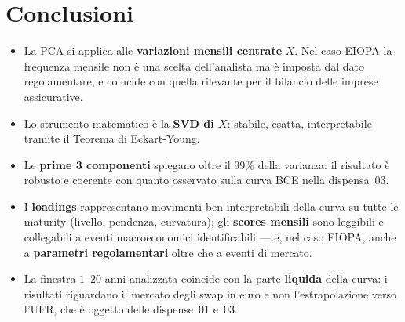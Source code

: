\documentclass[11pt,a4paper]{article}
\newcommand{\UFR}{\ensuremath{\mathrm{UFR}}}
\theoremstyle{plain}
\theoremstyle{definition}
\theoremstyle{remark}
\begin{document}
\section{Conclusioni}

\begin{itemize}
  \item La PCA si applica alle \textbf{variazioni mensili centrate} $X$. Nel
        caso EIOPA la frequenza mensile non \`e una scelta dell'analista ma
        \`e imposta dal dato regolamentare, e coincide con quella rilevante
        per il bilancio delle imprese assicurative.
  \item Lo strumento matematico \`e la \textbf{SVD di $X$}: stabile, esatta,
        interpretabile tramite il Teorema di Eckart-Young.
  \item Le \textbf{prime 3 componenti} spiegano oltre il 99\% della varianza:
        il risultato \`e robusto e coerente con quanto osservato sulla curva
        BCE nella dispensa~03.
  \item I \textbf{loadings} rappresentano movimenti ben interpretabili della
        curva su tutte le maturity (livello, pendenza, curvatura); gli
        \textbf{scores mensili} sono leggibili e collegabili a eventi
        macroeconomici identificabili --- e, nel caso EIOPA, anche a
        \textbf{parametri regolamentari} oltre che a eventi di mercato.
  \item La finestra $1$--$20$ anni analizzata coincide con la parte
        \textbf{liquida} della curva: i risultati riguardano il mercato degli
        swap in euro e non l'estrapolazione verso l'$\UFR$, che \`e oggetto
        delle dispense~01 e~03.
\end{itemize}
\end{document}
